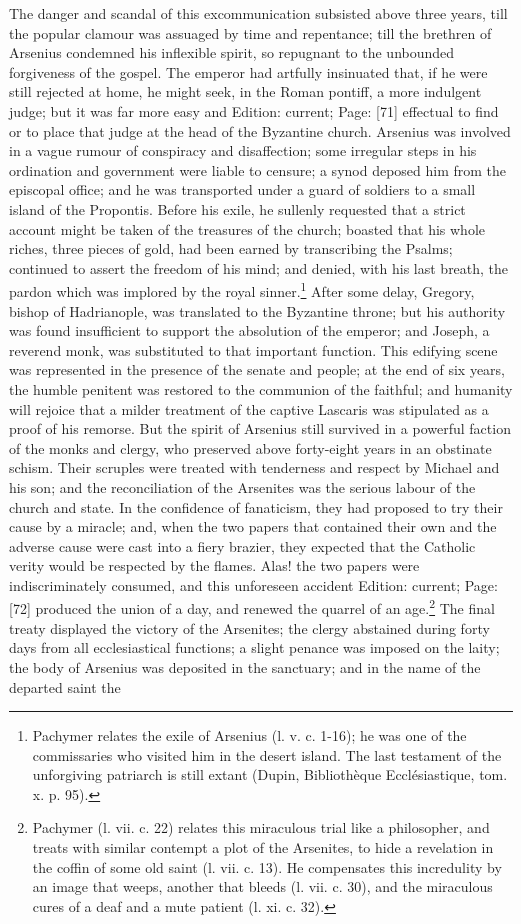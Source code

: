 The danger and scandal of this excommunication subsisted above three years, till the popular clamour was assuaged by time and repentance; till the brethren of Arsenius condemned his inflexible spirit, so repugnant to the unbounded forgiveness of the gospel. The emperor had artfully insinuated that, if he were still rejected at home, he might seek, in the Roman pontiff, a more indulgent judge; but it was far more easy and Edition: current; Page: [71] effectual to find or to place that judge at the head of the Byzantine church. Arsenius was involved in a vague rumour of conspiracy and disaffection; some irregular steps in his ordination and government were liable to censure; a synod deposed him from the episcopal office; and he was transported under a guard of soldiers to a small island of the Propontis. Before his exile, he sullenly requested that a strict account might be taken of the treasures of the church; boasted that his whole riches, three pieces of gold, had been earned by transcribing the Psalms; continued to assert the freedom of his mind; and denied, with his last breath, the pardon which was implored by the royal sinner.\footnote{Pachymer relates the exile of Arsenius (l. v. c. 1-16); he was one of the commissaries who visited him in the desert island. The last testament of the unforgiving patriarch is still extant (Dupin, Bibliothèque Ecclésiastique, tom. x. p. 95).} After some delay, Gregory, bishop of Hadrianople, was translated to the Byzantine throne; but his authority was found insufficient to support the absolution of the emperor; and Joseph, a reverend monk, was substituted to that important function. This edifying scene was represented in the presence of the senate and people; at the end of six years, the humble penitent was restored to the communion of the faithful; and humanity will rejoice that a milder treatment of the captive Lascaris was stipulated as a proof of his remorse. But the spirit of Arsenius still survived in a powerful faction of the monks and clergy, who preserved above forty-eight years in an obstinate schism. Their scruples were treated with tenderness and respect by Michael and his son; and the reconciliation of the Arsenites was the serious labour of the church and state. In the confidence of fanaticism, they had proposed to try their cause by a miracle; and, when the two papers that contained their own and the adverse cause were cast into a fiery brazier, they expected that the Catholic verity would be respected by the flames. Alas! the two papers were indiscriminately consumed, and this unforeseen accident Edition: current; Page: [72] produced the union of a day, and renewed the quarrel of an age.\footnote{Pachymer (l. vii. c. 22) relates this miraculous trial like a philosopher, and treats with similar contempt a plot of the Arsenites, to hide a revelation in the coffin of some old saint (l. vii. c. 13). He compensates this incredulity by an image that weeps, another that bleeds (l. vii. c. 30), and the miraculous cures of a deaf and a mute patient (l. xi. c. 32).} The final treaty displayed the victory of the Arsenites; the clergy abstained during forty days from all ecclesiastical functions; a slight penance was imposed on the laity; the body of Arsenius was deposited in the sanctuary; and in the name of the departed saint the 